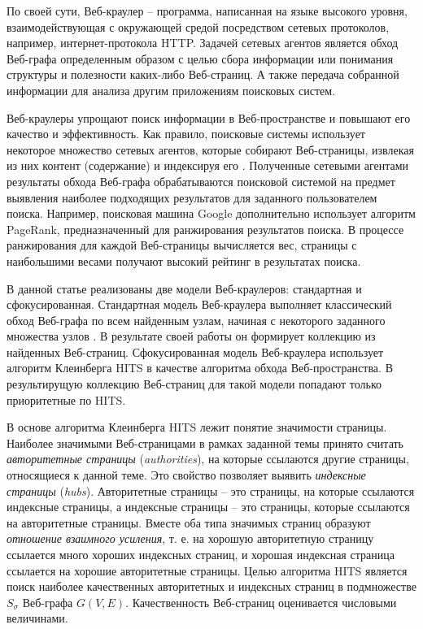 По своей сути, Веб-краулер -- программа, написанная на языке высокого уровня, взаимодействующая с окружающей средой посредством сетевых протоколов, например, интернет-протокола HTTP. Задачей сетевых агентов является обход Веб-графа определенным образом с целью сбора информации или понимания структуры и полезности каких-либо Веб-страниц. А также передача собранной информации для анализа другим приложениям поисковых систем.

Веб-краулеры упрощают поиск информации в Веб-пространстве и повышают его качество и эффективность. Как правило, поисковые системы использует некоторое множество сетевых агентов, которые собирают Веб-страницы, извлекая из них контент (содержание) и индексируя его \cite{ManningRaghavanSchutze}. Полученные сетевыми агентами результаты обхода Веб-графа обрабатываются поисковой системой на предмет выявления наиболее подходящих результатов для заданного пользователем поиска. Например, поисковая машина Google дополнительно использует алгоритм PageRank, предназначенный для ранжирования результатов поиска. В процессе ранжирования для каждой Веб-страницы вычисляется вес, страницы с наибольшими весами получают высокий рейтинг в результатах поиска.

В данной статье реализованы две модели Веб-краулеров: стандартная и сфокусированная. Стандартная модель Веб-краулера выполняет классический обход Веб-графа по всем найденным узлам, начиная с некоторого заданного множества узлов \cite{ArasuChoGM}. В результате своей работы он формирует коллекцию из найденных Веб-страниц. Сфокусированная модель Веб-краулера использует алгоритм Клеинберга HITS в качестве алгоритма обхода Веб-пространства. В результирущую коллекцию Веб-страниц для такой модели попадают только приоритетные по HITS.

В основе алгоритма Клеинберга HITS лежит понятие значимости страницы. Наиболее значимыми Веб-страницами в рамках заданной темы принято считать \textit{авторитетные страницы} (\textit{authorities}), на которые ссылаются другие страницы, относящиеся к данной теме. Это свойство позволяет выявить \textit{индексные страницы} (\textit{hubs}). Авторитетные страницы -- это страницы, на которые ссылаются индексные страницы, а индексные страницы -- это страницы, которые ссылаются на авторитетные страницы. Вместе оба типа значимых страниц образуют \textit{отношение взаимного усиления}, т. е. на хорошую авторитетную страницу ссылается много хороших индексных страниц, и хорошая индексная страница ссылается на хорошие авторитетные страницы. Целью алгоритма HITS является поиск наиболее качественных авторитетных и индексных страниц в подмножестве \(S_\sigma\) Веб-графа \(G(V, E)\). Качественность Веб-страниц оценивается числовыми величинами.

